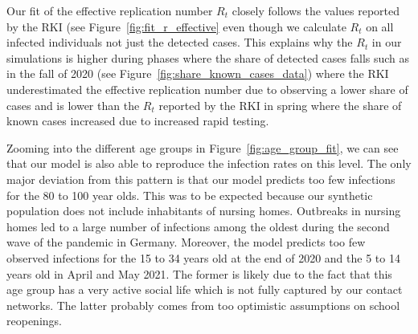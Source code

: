 \begin{figure}[ht]
\end{figure}

Our fit of the effective replication number $R_t$ closely follows the values reported by
the RKI (see Figure~\ref{fig:fit_r_effective} even though we calculate $R_t$ on all
infected individuals not just the detected cases. This explains why the $R_t$ in our
simulations is higher during phases where the share of detected cases falls such as in
the fall of 2020 (see Figure~\ref{fig:share_known_cases_data}) where the RKI
underestimated the effective replication number due to observing a lower share of cases
and is lower than the $R_t$ reported by the RKI in spring where the share of known cases
increased due to increased rapid testing.

\FloatBarrier

Zooming into the different age groups in Figure~\ref{fig:age_group_fit}, we can see that
our model is also able to reproduce the infection rates on this level.
The only major deviation from this pattern is that
our model predicts too few infections for the 80 to 100 year olds.
This was to be expected because our synthetic population does not include inhabitants of
nursing homes. Outbreaks in nursing homes led to a large number of infections among
the oldest during the second wave of the pandemic in Germany.
Moreover, the model predicts too few observed infections for the 15 to 34 years old at
the end of 2020 and the 5 to 14 years old in April and May 2021. The former is likely
due to the fact that this age group has a very active social life which is not fully
captured by our contact networks. The latter probably comes from too optimistic
assumptions on school reopenings.


